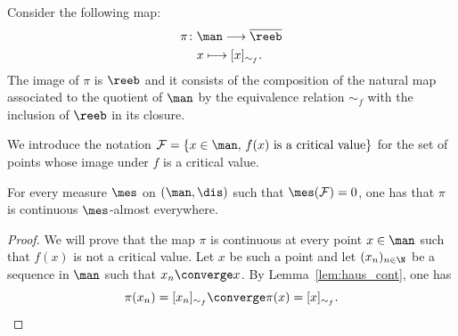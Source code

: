 Consider the following map:
\begin{align*}
\pi\colon&\man\longrightarrow\overline{\reeb}\\
&x\longmapsto[x]_{\sim_f}.
\end{align*}
The image of $\pi$ is $\reeb$ and it consists of the composition of the natural map associated to the quotient of $\man$ by the equivalence relation $\sim_f$ with the inclusion of $\reeb$ in its closure.
 
 We introduce the notation $\mathcal{F}=\left\{x\in\man,\,f(x)\text{ is a critical value}\right\} $ for the set of points whose image under $f$ is a critical value.

\begin{proposition}\label{prop:pi_cont}  For every measure $\mes$ on $(\man,\dis)$ such that $\mes(\mathcal{F})=0$, one has that
$\pi$ is continuous $\mes$-almost everywhere.
\end{proposition}

\begin{proof}
We will prove that the map $\pi$ is continuous at every point $x\in\man$ such that $f(x)$ is not a critical value. Let $x$ be such a point and let $(x_n)_{n\in\N}$ be a sequence in $\man$ such that $x_n\converge x$. By Lemma~\ref{lem:haus_cont}, one has $$\pi(x_n)=[x_n]_{\sim_f}\converge \pi(x)=[x]_{\sim_f}.$$
\end{proof}



